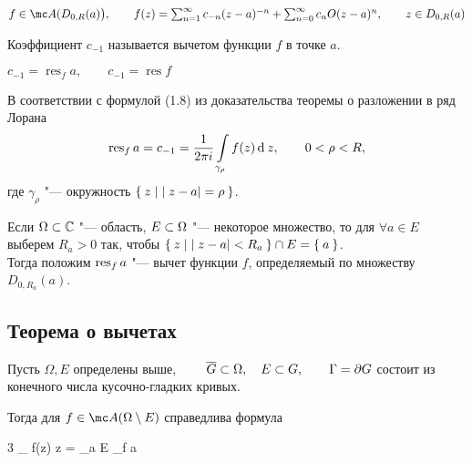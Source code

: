 \begin{definition}
	$ f \in \mc A(D_{0, R}(a) \big), \qquad f(z) = \sum_{n = 1}^\infty c_{-n}(z - a)^{-n} + \sum_{n = 0}^\infty c_nO(z - a)^n, \qquad z \in D_{0, R}(a) $

	Коэффициент $ c_{-1} $ называется вычетом функции $ f $ в точке $ a $.
\end{definition}

\begin{notation}
	$ c_{-1} = \operatorname{res}_f a, \qquad c_{-1} = \operatorname{res} f $
\end{notation}

В соответствии с формулой (1.8) из доказательства теоремы о разложении в ряд Лорана
$$ \operatorname{res}_f a = c_{-1} = \frac1{2\pi i} \int\limits_{\gamma_\rho} f(z) \operatorname{d}^{} z, \qquad 0 < \rho < R, $$
где $ \gamma_\rho $ "--- окружность $ \Set{z \mid |z - a| = \rho} $.

Если $ \Omega \subset \mathbb{C} $ "--- область, $ E \subset \Omega $ "--- некоторое множество, то для $ \forall a \in E $ выберем $ R_a > 0 $ так, чтобы $ \Set{z \mid |z - a| < R_a} \cap E = \Set a $. \\
Тогда положим $ \operatorname{res}_f a $ "--- вычет функции $ f $, определяемый по множеству $ D_{0, R_a}(a) $.

\subsection{Теорема о вычетах}

\begin{theorem}
	Пусть $ \Omega, E $ определены выше, $ \qquad \overline G \subset \Omega, \quad E \subset G, \qquad \Gamma = \partial G $ состоит из конечного числа кусочно-гладких кривых.

	Тогда для $ f \in \mc A (\Omega \setminus E) $ справедлива формула
	\begin{equ}3
		 \int\limits_{\curvedir \Gamma} f(z) \di z = \sum_{a \in E} \res_f a
	\end{equ}
\end{theorem}

